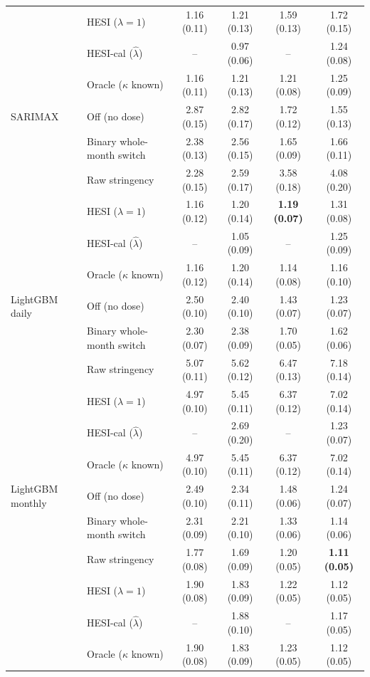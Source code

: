 \documentclass{article}
\theoremstyle{plain}
\theoremstyle{definition}
\theoremstyle{remark}
\begin{document}
\begin{table}[h]
\begin{tabular}{llcccc}
 & HESI ($\lambda=1$) & 1.16 (0.11) & 1.21 (0.13) & 1.59 (0.13) & 1.72 (0.15) \\
 & HESI-cal ($\hat\lambda$) & -- & 0.97 (0.06) & -- & 1.24 (0.08) \\
 & Oracle ($\kappa$ known) & 1.16 (0.11) & 1.21 (0.13) & 1.21 (0.08) & 1.25 (0.09) \\
\addlinespace
SARIMAX & Off (no dose) & 2.87 (0.15) & 2.82 (0.17) & 1.72 (0.12) & 1.55 (0.13) \\
 & Binary whole-month switch & 2.38 (0.13) & 2.56 (0.15) & 1.65 (0.09) & 1.66 (0.11) \\
 & Raw stringency & 2.28 (0.15) & 2.59 (0.17) & 3.58 (0.18) & 4.08 (0.20) \\
 & HESI ($\lambda=1$) & 1.16 (0.12) & 1.20 (0.14) & \textbf{1.19 (0.07)} & 1.31 (0.08) \\
 & HESI-cal ($\hat\lambda$) & -- & 1.05 (0.09) & -- & 1.25 (0.09) \\
 & Oracle ($\kappa$ known) & 1.16 (0.12) & 1.20 (0.14) & 1.14 (0.08) & 1.16 (0.10) \\
\addlinespace
LightGBM daily & Off (no dose) & 2.50 (0.10) & 2.40 (0.10) & 1.43 (0.07) & 1.23 (0.07) \\
 & Binary whole-month switch & 2.30 (0.07) & 2.38 (0.09) & 1.70 (0.05) & 1.62 (0.06) \\
 & Raw stringency & 5.07 (0.11) & 5.62 (0.12) & 6.47 (0.13) & 7.18 (0.14) \\
 & HESI ($\lambda=1$) & 4.97 (0.10) & 5.45 (0.11) & 6.37 (0.12) & 7.02 (0.14) \\
 & HESI-cal ($\hat\lambda$) & -- & 2.69 (0.20) & -- & 1.23 (0.07) \\
 & Oracle ($\kappa$ known) & 4.97 (0.10) & 5.45 (0.11) & 6.37 (0.12) & 7.02 (0.14) \\
\addlinespace
LightGBM monthly & Off (no dose) & 2.49 (0.10) & 2.34 (0.11) & 1.48 (0.06) & 1.24 (0.07) \\
 & Binary whole-month switch & 2.31 (0.09) & 2.21 (0.10) & 1.33 (0.06) & 1.14 (0.06) \\
 & Raw stringency & 1.77 (0.08) & 1.69 (0.09) & 1.20 (0.05) & \textbf{1.11 (0.05)} \\
 & HESI ($\lambda=1$) & 1.90 (0.08) & 1.83 (0.09) & 1.22 (0.05) & 1.12 (0.05) \\
 & HESI-cal ($\hat\lambda$) & -- & 1.88 (0.10) & -- & 1.17 (0.05) \\
 & Oracle ($\kappa$ known) & 1.90 (0.08) & 1.83 (0.09) & 1.23 (0.05) & 1.12 (0.05) \\
\bottomrule
\end{tabular}
\end{table}
\end{document}
